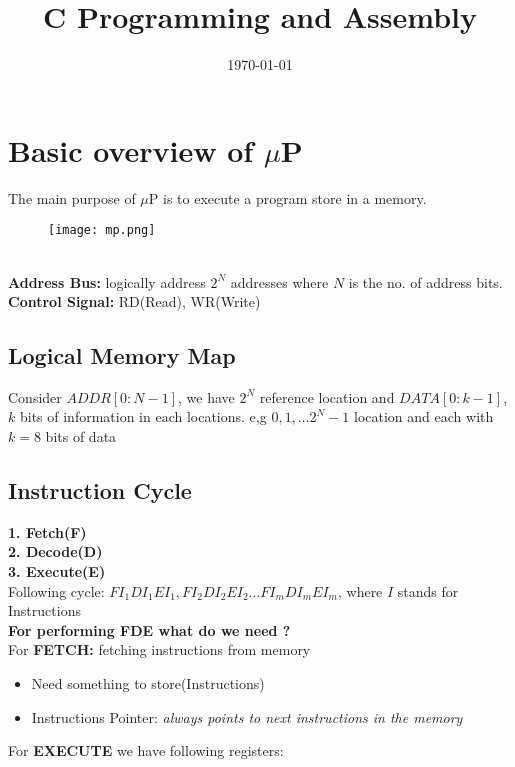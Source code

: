 \documentclass[12pt,a4paper]{article}
\title{C Programming and Assembly \vspace{-2em}}
\date{\today}
\begin{document}
  \maketitle
  
  \section{Basic overview of $\mu$P}
  The main purpose of $\mu$P is to execute a program store in a memory.\\
 \begin{figure}[h]
 	\texttt{[image: mp.png]}
 	\centering
 \end{figure}
\\
\textbf{Address Bus:} logically address $2^N$ addresses where $N$ is the no. of address bits. \\
\textbf{Control Signal:} RD(Read), WR(Write)

\subsection{Logical Memory Map}
 Consider $ADDR[0:N-1]$, we have $2^N$ reference location and $DATA[0:k-1]$, $k$ bits of information in each locations. e,g $0,1, \dots 2^N-1$ location and each with $k=8$ bits of data

\subsection{Instruction Cycle}
\textbf{1. Fetch(F)}\\
\textbf{2. Decode(D)}\\
\textbf{3. Execute(E)} \\
Following cycle: $FI_1DI_1EI_1, FI_2DI_2EI_2 \dots FI_mDI_mEI_m$, where $I$ stands for Instructions \\
\textbf{For performing FDE what do we need ?} \\
For \textbf{FETCH: } fetching instructions from memory
\begin{itemize}
	\item Need something to store(Instructions)
	\item Instructions Pointer: \textit{always points to next instructions in the memory}
\end{itemize}
For \textbf{EXECUTE} we have following registers:


 
\end{document}
